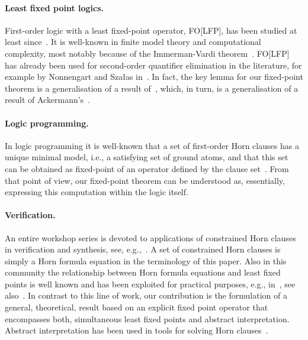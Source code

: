 \documentclass[acmsmall]{acmart}
\theoremstyle{plain}
\theoremstyle{definition}
\begin{document}
\paragraph{Least fixed point logics.}

First-order logic with a least fixed-point operator, FO[LFP], has been
 studied at least since~\cite{Moschovakis74Elementary}.
It is well-known in finite model theory and computational complexity, most
 notably because of the Immerman-Vardi theorem~\cite{Vardi82Complexity,Immerman86Relational}.
FO[LFP] has already been used for second-order quantifier elimination in the literature, for example
 by Nonnengart and Sza{\l}as in~\cite{Nonnengart98Fixpoint}.
In fact, the key lemma for our fixed-point theorem is a generalisation of a result
 of~\cite{Nonnengart98Fixpoint}, which, in turn, is a generalisation of a result of
 Ackermann's~\cite{Ackermann35Untersuchungen}.

\paragraph{Logic programming.}
%
In logic programming it is well-known that a set of first-order Horn clauses has a unique
 minimal model, i.e., a satisfying set of ground atoms, and that this set can be obtained
 as fixed-point of an operator defined by the clause set~\cite{Jaffar94Constraint}.
From that point of view, our fixed-point theorem can be understood as, essentially, expressing
 this computation within the logic itself.

\paragraph{Verification.}

An entire workshop series is devoted to applications of constrained Horn clauses in
 verification and synthesis, see, e.g.,~\cite{Hojjat21Proceedings}.
A set of constrained Horn clauses is simply a Horn formula equation in the terminology of this
 paper.
Also in this community the relationship between Horn formula equations and least fixed points
 is well known and has been exploited for practical purposes, e.g., in~\cite{Unno17Automating},
 see also~\cite{Tsukada22Software}.
In contrast to this line of work, our contribution is the formulation of a general,
 theoretical, result based on an explicit fixed point operator that encompasses both,
 simultaneous least fixed points and abstract interpretation.
Abstract interpretation has been used in tools for solving Horn
 clauses~\cite{Hoder11muZ,Kafle16Rahft}.
\end{document}
